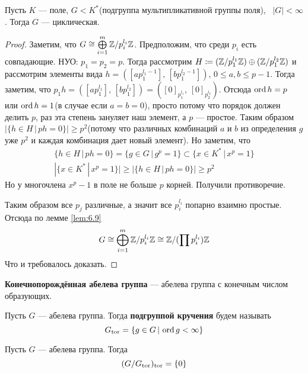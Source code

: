 \documentclass[../main.tex]{subfiles}
\begin{document}
\begin{corollary*}
  Пусть $K$ --- поле, $G < K^{*}$(подгруппа мультипликативной группы поля), \, $|G| < \infty$. Тогда $G$ --- циклическая.
\end{corollary*}
\begin{proof}
  Заметим, что $G \cong \bigoplus\limits_{i = 1}^{m} \mathbb{Z}/p_i^{l_i}\mathbb{Z}$. Предположим, что среди $p_i$ есть совпадающие. НУО: $p_1 = p_2 = p$. Тогда рассмотрим $H \coloneqq (\mathbb{Z}/p_1^{l_1}\mathbb{Z}) \oplus (\mathbb{Z}/p_1^{l_2}\mathbb{Z})$ и рассмотрим элементы вида $h = ([ap_1^{l_1 - 1}], \, [bp_1^{l_2 - 1}]), \, 0 \leq a, b \leq p - 1$. Тогда заметим, что $p_1 h = ([ap_1^{l_1}], \, [bp_1^{l_2}]) = ([0]_{p_1^{l_1}},\, [0]_{p_2^{l_2}})$. Отсюда $\operatorname{ord} h = p$ или $\operatorname{ord} h = 1$(в случае если $a = b = 0$), просто потому что порядок должен делить $p$, раз эта степень зануляет наш элемент, а $p$ --- простое.
  Таким образом $ |\{h \in H \, | \, ph = 0\}| \geq p^2$(потому что различных комбинаций $a$ и $b$ из определения $g$ уже $p^2$ и каждая комбинация дает новый элемент). Но заметим, что
  \begin{equation*}
    \begin{gathered}
      \{h \in H \, | \, p h = 0\} = \{g \in G \, | \, g^p = 1\} \subset \{x \in K^{*} \, | \, x^p = 1\} \\
      |\{x \in K^{*} \, | \, x^p = 1\}| \geq |\{h \in H \, | \, p h = 0\}| \geq p^2
    \end{gathered}
  \end{equation*}
  Но у многочлена $x^p - 1$ в поле не больше $p$ корней. Получили противоречие.

  Таким образом все $p_j$ различные, а значит все $p_i^{l_i}$ попарно взаимно простые. Отсюда по лемме \ref{lem:6.9}
  \begin{equation*}
    G \cong \bigoplus\limits_{i = 1}^{m} \mathbb{Z}/p_{i}^{l_i}\mathbb{Z} \cong \mathbb{Z}/(\prod p_i^{l_i})\mathbb{Z}
  \end{equation*}
  Что и требовалось доказать.
\end{proof}

\begin{definition}
  \textbf{Конечнопорождённая абелева группа} --- абелева группа с конечным числом образующих.
\end{definition}

\begin{definition}
  Пусть $G$ --- абелева группа. Тогда \textbf{подгруппой кручения} будем называть
  \begin{equation*}
    G_{\operatorname{tor}} = \{g \in G \, | \, \operatorname{ord} g < \infty\}
  \end{equation*}
\end{definition}
\begin{remark}
  Пусть $G$ --- абелева группа. Тогда
  \begin{equation*}
    (G/G_{\operatorname{tor}})_{\operatorname{tor}} = \{0\}
  \end{equation*}
\end{remark}
\end{document}
